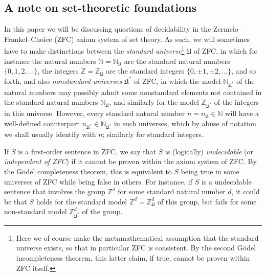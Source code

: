 \documentclass[reqno,a4paper,12pt]{amsart}
\numberwithin{equation}{section}
\numberwithin{figure}{section}
\def\Z{\mathbb{Z}}
\def\N{\mathbb{N}}
\newcommand{\Universe}{{\mathfrak{U}}}
\theoremstyle{plain}
\theoremstyle{definition}
\begin{document}
\subsection{A note on set-theoretic foundations}

In this paper we will be discussing questions of decidability in the Zermelo--Frankel--Choice (ZFC) axiom system of set theory.  As such, we will sometimes have to make distinctions between the \emph{standard universe}\footnote{Here we of course make the metamathematical assumption that the standard universe exists, so that in particular ZFC is consistent.  By the second G\"odel incompleteness theorem, this latter claim, if true, cannot be proven within ZFC itself.} $\Universe$ of ZFC, in which for instance the natural numbers $\N = \N_\Universe$ are the standard natural numbers $\{0,1,2,\dots\}$, the integers $\Z = \Z_\Universe$ are the standard integers $\{0, \pm 1, \pm 2,\dots \}$, and so forth, and also \emph{nonstandard universes} $\Universe^*$ of ZFC, in which the model $\N_{\Universe^*}$ of the natural numbers may possibly admit some nonstandard elements not contained in the standard natural numbers $\N_\Universe$, and similarly for the model $\Z_{\Universe^*}$ of the integers in this universe.  However, every standard natural number $n = n_\Universe \in \N$ will have a well-defined counterpart $n_{\Universe^*} \in \N_{\Universe^*}$ in such universes, which by abuse of notation we shall usually identify with $n$; similarly for standard integers. 

If $S$ is a first-order sentence in ZFC, we say that $S$ is (logically) \emph{undecidable} (or \emph{independent of ZFC}) if it cannot be proven within the axiom system of ZFC.  By the G\"odel completeness theorem, this is equivalent to $S$ being true in some universes of ZFC while being false in others.  For instance, if $S$ is a undecidable sentence that involves the group $\Z^d$ for some standard natural number $d$, it could be that $S$ holds for the standard model $\Z^d = \Z_\Universe^d$ of this group, but fails for some non-standard model $\Z_{\Universe^*}^d$ of the group.
\end{document}
